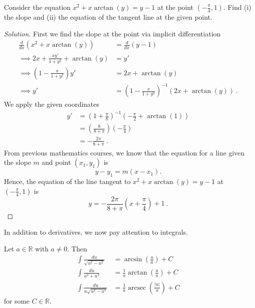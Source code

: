 \documentclass[compacto,10pt,comentarios]{aleph-notas}
\DeclareMathOperator{\arcsec}{arcsec}
\begin{document}
\begin{ejer}
    Consider the equation $x^2 + x \arctan(y) = y - 1$ at the point $\left( -\frac{\pi}{4}, 1 \right)$. Find (i) the slope and (ii) the equation of the tangent line at the given point.
\end{ejer}
\begin{proof}[Solution]
    First we find the slope at the point via implicit differentiation
    \begin{align*}
        \frac{d}{dx} \left( x^2 + x \arctan(y) \right) & = \frac{d}{dx} \left( y - 1 \right) \\
        \implies 2x + \frac{x y'}{1 + y^2} + \arctan(y) & = y' \\
        \implies \left(1 - \frac{x}{1+y^2} \right) y' & =  2x + \arctan(y) \\
        \implies y' & = \left(1 - \frac{x}{1+y^2} \right)^{-1} \left( 2x + \arctan(y) \right) ~ .
    \end{align*}
    We apply the given coordinates
    \begin{align*}
        y' & = \left( 1 + \frac{\pi}{8} \right)^{-1} \left( -\frac{\pi}{2} + \arctan(1) \right) \\
        & = \left( \frac{8}{8 + \pi} \right) \left( - \frac{\pi}{4} \right) \\
        & = -\frac{2\pi}{8 + \pi} ~ . 
    \end{align*}
    From previous mathematics courses, we know that the equation for a line given the slope $m$ and point $(x_{1}, y_{1})$ is
    $$
    y - y_1 = m (x - x_{1}).
    $$
    Hence, the equation of the line tangent to $x^{2} + x\arctan(y) = y - 1$ at $(-\frac{\pi}{4}, 1)$ is
    $$
    y = -\frac{2\pi}{8 + \pi} \left( x + \frac{\pi}{4} \right) + 1 ~ .
    $$
\end{proof}

In addition to derivatives, we now pay attention to integrals.
\begin{defi}
Let $a \in \mathbb{R}$ with $a \neq 0$. Then
\begin{align*}
    \int \frac{du}{\sqrt{a^2 - u^{2}}} & = \arcsin\left( \frac{u}{a} \right) + C \\
    \int \frac{du}{a^{2} + u^{2}} & = \frac{1}{a} \arctan \left( \frac{u}{a} \right) + C \\
    \int \frac{du}{u \sqrt{u^{2} - a^{2}}} & = \frac{1}{a} \arcsec\left( \frac{|u|}{a} \right) + C
\end{align*}
    for some $C \in \mathbb{R}$.
\end{defi}
\end{document}
